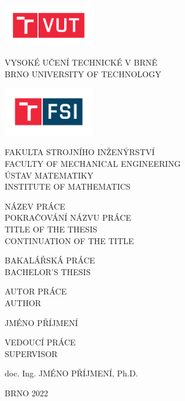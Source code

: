 \documentclass[a4paper,12pt,twoside]{article}
\theoremstyle{definition}
\theoremstyle{remark}
\numberwithin{equation}{section}
\numberwithin{table}{section}
\numberwithin{figure}{section}
\newcommand{\tflarge}{\normalfont\sffamily\large\textmd}
\newcommand{\tfsmall}{\normalfont\sffamily\small\textmd}
\begin{document}
\thispagestyle{empty}
\noindent
\parbox[c]{4.2cm}{\includegraphics[width=4cm]{VUT.pdf}}
\parbox[c][1.5cm][t]{10cm}{\tflarge{VYSOKÉ UČENÍ TECHNICKÉ V BRNĚ}\\[0mm]\tfsmall{BRNO UNIVERSITY OF TECHNOLOGY}}

\vspace{1cm}\noindent
\parbox[c]{4.2cm}{\includegraphics[width=4cm]{FSI.pdf}}
\parbox[c][1.65cm][t]{10cm}{\tflarge{FAKULTA STROJNÍHO INŽENÝRSTVÍ}\\
\tfsmall{FACULTY OF MECHANICAL ENGINEERING}\\[3mm]
\tflarge{ÚSTAV MATEMATIKY}\\
\tfsmall{INSTITUTE OF MATHEMATICS}
}

\vspace{4cm}\noindent
{\normalfont\sffamily\Large\textmd{NÁZEV PRÁCE\\[2mm] 
		POKRAČOVÁNÍ NÁZVU PRÁCE}}
\\[5mm]
{\normalfont\sffamily\textmd{TITLE OF THE THESIS\\[0.5mm] CONTINUATION OF THE TITLE}}

\vspace{5cm}\noindent
{\tflarge{BAKALÁŘSKÁ PRÁCE}}\\
{\tfsmall{BACHELOR'S THESIS}}

\vspace{1cm}\noindent
\parbox[t]{7.2cm}{\tflarge{AUTOR PRÁCE}\\ \tfsmall{AUTHOR}}\parbox[b]{5cm}{\tflarge{JMÉNO PŘÍJMENÍ}}

\vspace{1cm}\noindent
\parbox[t]{7.2cm}{\sf \large VEDOUCÍ PRÁCE\\ \small SUPERVISOR}\parbox[b]{8.3cm}{\sf \large doc. Ing. JMÉNO PŘÍJMENÍ, Ph.D.}

\vspace{3.2cm}\noindent
{\sf BRNO 2022}

\newpage
\thispagestyle{empty}
\
\end{document}
